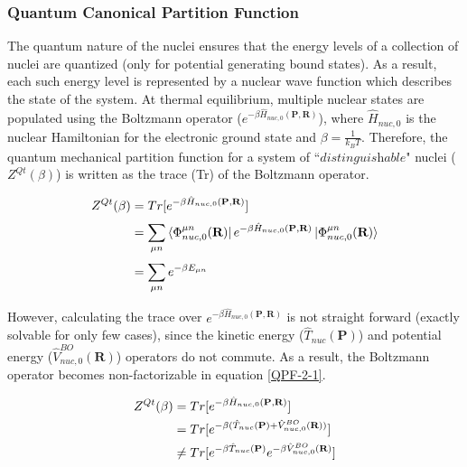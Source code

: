 \subsubsection{Quantum Canonical Partition Function}

The quantum nature of the nuclei ensures that the energy levels of a collection of nuclei are quantized (only for potential generating bound states). As a result, each such energy level is represented by a nuclear wave function which describes the state of the system. At thermal equilibrium, multiple nuclear states are populated using the Boltzmann operator ($e^{-\beta\hat{H}_{nuc,0}(\textbf{P},\textbf{R})}$), where $\hat{H}_{nuc,0}$ is the nuclear Hamiltonian for the electronic ground state and $\beta= \frac{1}{k_BT}$. Therefore, the quantum mechanical partition function for a system of ``$\textit{distinguishable}$" nuclei  ($Z^{Qt}(\beta)$) is written as the trace (Tr) of the Boltzmann operator. 

\begin{align}
    Z^{Qt}(\beta)&=Tr[e^{-\beta\hat{H}_{nuc,0}(\textbf{P},\textbf{R})}]\label{QPF-1-1}\\  
    &=\sum_{\mu n}^{}\bra{\Phi^{\mu n}_{nuc,0}(\textbf{R})} e^{-\beta\hat{H}_{nuc,0}(\textbf{P},\textbf{R})} \ket{\Phi^{\mu n}_{nuc,0}(\textbf{R})}\label{QPF-1-2}\\
    &=\sum_{\mu n}^{}e^{-\beta E_{\mu n}}\label{QPF-1-3}
\end{align}

\noindent However, calculating the trace over $e^{-\beta\hat{H}_{nuc,0}(\textbf{P},\textbf{R})}$ is not straight forward (exactly solvable for only few cases), since the kinetic energy ($\hat{T}_{nuc}(\textbf{P})$) and potential energy ($\hat{V}^{BO}_{nuc,0}(\textbf{R})$) operators do not commute. As a result, the Boltzmann operator becomes non-factorizable in equation \ref{QPF-2-1}. 

\begin{align}
    Z^{Qt}(\beta)&=Tr[e^{-\beta\hat{H}_{nuc,0}(\textbf{P},\textbf{R})}] \notag\\  &=Tr[e^{-\beta(\hat{T}_{nuc}(\textbf{P})+\hat{V}^{BO}_{nuc,0}(\textbf{R}))}]\label{QPF-2-1}\\
    &\neq Tr[e^{-\beta\hat{T}_{nuc}(\textbf{P})}e^{-\beta \hat{V}^{BO}_{nuc,0}(\textbf{R})}]\label{QPF-2-2}
\end{align}


